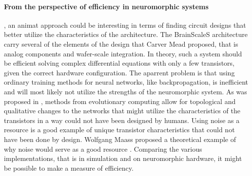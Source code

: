 \paragraph{From the perspective of efficiency in neuromorphic systems}, an animat approach could be interesting in terms of finding circuit designs that better utilize the characteristics of the architecture.
The BrainScaleS architecture carry several of the elements of the design that Carver Mead proposed, that is analog components and wafer-scale integration.
In theory, such a system should be efficient solving complex differential equations with only a few transistors, given the correct hardware configuration.
The aparrent problem is that using ordinary training methods for neural networks, like backpropagation, is inefficient and will most likely not utilize the strengths of the neuromorphic system.
As was proposed in \cite{schuman_evolutionary_2016}, methods from evolutionary computing allow for topological and qualitative changes to the networks that might utilize the characteristics of the transistors in a way could not have been designed by humans.
Using noise as a resource is a good example of unique transistor characteristics that could not have been done by design.
Wolfgang Maass proposed a theoretical example of why noise would serve as a good resource \cite{maass_noise_2014}.
Comparing the various implementations, that is in simulation and on neuromorphic hardware, it might be possible to make a measure of efficiency.

